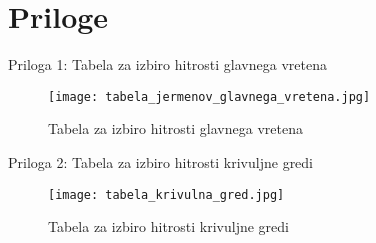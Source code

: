 \newpage

\section{Priloge}

Priloga 1: Tabela za izbiro hitrosti glavnega vretena
\label{tabela_za_izbiro_hitrosti}
\begin{figure}[H]
	\begin{center}
		\texttt{[image: tabela\_jermenov\_glavnega\_vretena.jpg]}
		\caption{Tabela za izbiro hitrosti glavnega vretena
			\cite{gauthier}}
	\end{center}
\end{figure}

\newpage

Priloga 2: Tabela za izbiro hitrosti krivuljne gredi
\label{tabela_krivuljna_gred}
\begin{figure}[H]
	\begin{center}
		\texttt{[image: tabela\_krivulna\_gred.jpg]}
		\caption{Tabela za izbiro hitrosti krivuljne gredi
			\cite{gauthier}}
	\end{center}
\end{figure}